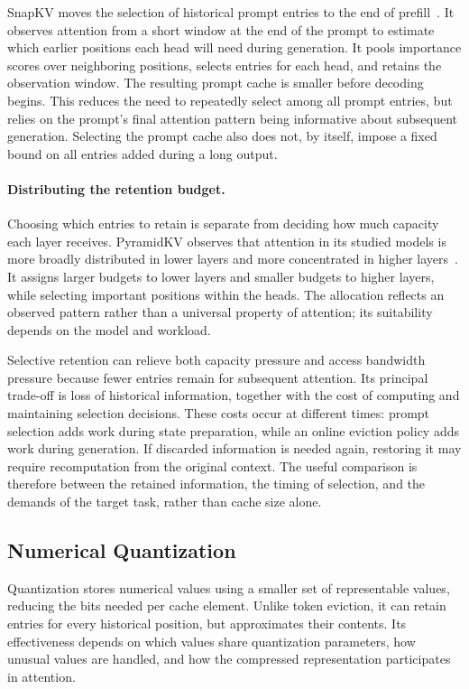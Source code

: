 SnapKV moves the selection of historical prompt entries to the end of prefill~\cite{kv_li2024snapkv}. It observes attention from a short window at the end of the prompt to estimate which earlier positions each head will need during generation. It pools importance scores over neighboring positions, selects entries for each head, and retains the observation window. The resulting prompt cache is smaller before decoding begins. This reduces the need to repeatedly select among all prompt entries, but relies on the prompt's final attention pattern being informative about subsequent generation. Selecting the prompt cache also does not, by itself, impose a fixed bound on all entries added during a long output.

\paragraph{Distributing the retention budget.}
Choosing which entries to retain is separate from deciding how much capacity each layer receives. PyramidKV observes that attention in its studied models is more broadly distributed in lower layers and more concentrated in higher layers~\cite{kv_cai2025pyramidkv}. It assigns larger budgets to lower layers and smaller budgets to higher layers, while selecting important positions within the heads. The allocation reflects an observed pattern rather than a universal property of attention; its suitability depends on the model and workload.

Selective retention can relieve both capacity pressure and access bandwidth pressure because fewer entries remain for subsequent attention. Its principal trade-off is loss of historical information, together with the cost of computing and maintaining selection decisions. These costs occur at different times: prompt selection adds work during state preparation, while an online eviction policy adds work during generation. If discarded information is needed again, restoring it may require recomputation from the original context. The useful comparison is therefore between the retained information, the timing of selection, and the demands of the target task, rather than cache size alone.

\subsection{Numerical Quantization}\label{sec:techniques:quantization}

Quantization stores numerical values using a smaller set of representable values, reducing the bits needed per cache element. Unlike token eviction, it can retain entries for every historical position, but approximates their contents. Its effectiveness depends on which values share quantization parameters, how unusual values are handled, and how the compressed representation participates in attention.

